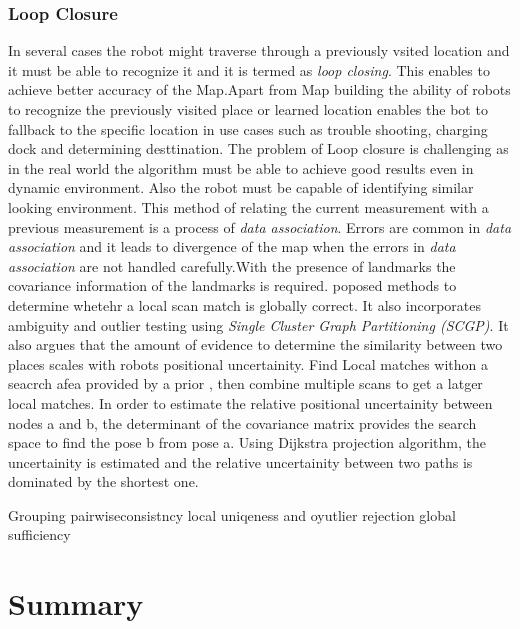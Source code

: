 \subsubsection{Loop Closure}
In several cases the robot might traverse through a previously vsited location and it must be able to recognize it and it is termed as \textit{loop closing}. This enables to 
achieve better accuracy of the Map.Apart from Map building the ability of robots to recognize the previously visited place or learned location enables the bot to fallback to 
the specific location in use cases such as trouble shooting, charging dock and determining desttination. 
The problem of Loop closure is challenging as in the real world the algorithm must be able to achieve good results even in dynamic environment. Also the robot must be capable 
of identifying similar looking environment. This method of relating the current measurement with a previous measurement is a process of \textit{data association}. Errors are 
common in \textit{data association} and it leads to divergence of the map when the errors in \textit{data association} are not handled carefully.With the presence of landmarks 
the covariance information of the landmarks is required.
\cite{E.Olson/LocalSM} poposed methods to determine whetehr a local scan match is globally correct. It also incorporates ambiguity and outlier testing using 
\textit{Single Cluster Graph Partitioning (SCGP)}. It also argues that the amount of evidence to determine the similarity between two places scales with robots positional uncertainity.
Find Local matches withon a seacrch afea provided by a prior , then combine multiple scans to get a latger local matches.
In order to estimate the relative positional uncertainity between nodes a and b, the determinant of the covariance matrix provides the search space to find the pose b from pose a.
Using Dijkstra projection algorithm, the uncertainity is estimated and the relative uncertainity between two paths is dominated by the shortest one. 

Grouping
pairwiseconsistncy
local uniqeness and oyutlier rejection
global sufficiency

\section{Summary}